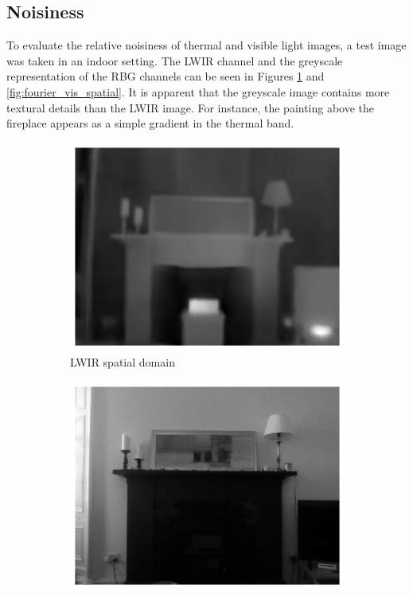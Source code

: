 \documentclass{l4proj}
\begin{document}
\subsection{Noisiness}

To evaluate the relative noisiness of thermal and visible light images, a test image was taken in an indoor setting. The LWIR channel and the greyscale representation of the RBG channels can be seen in Figures \ref{fig:fourier_lwir_spatial} and \ref{fig:fourier_vis_spatial}. It is apparent that the greyscale image contains more textural details than the LWIR image. For instance, the painting above the fireplace appears as a simple gradient in the thermal band.

\begin{figure}[ht]
  \centering
  \begin{subfigure}[h!]{0.4\textwidth}
    \includegraphics[width=\textwidth]{images/fourier/lwir_spatial}
    \caption{LWIR spatial domain}
    \label{fig:fourier_lwir_spatial}
  \end{subfigure}
  \begin{subfigure}[h!]{0.4\textwidth}
    \includegraphics[width=\textwidth]{images/fourier/gray_spatial}

\end{subfigure}
\end{figure}
\end{document}
